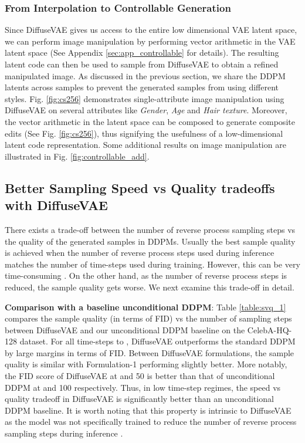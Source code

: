 \documentclass[10pt]{article} \usepackage[accepted]{tmlr}
\newcommand{\remove}[1]{}
\begin{document}
\subsubsection{From Interpolation to Controllable Generation}
Since DiffuseVAE gives us access to the entire low dimensional VAE latent space, we can perform image manipulation by performing vector arithmetic in the VAE latent space (See Appendix \ref{sec:app_controllable} for details). The resulting latent code can then be used to sample from DiffuseVAE to obtain a refined manipulated image. As discussed in the previous section, we share the DDPM latents across samples to prevent the generated samples from using different styles. Fig. \ref{fig:cs256} demonstrates single-attribute image manipulation using DiffuseVAE on several attributes like \textit{Gender}, \textit{Age} and \textit{Hair texture}. Moreover, the vector arithmetic in the latent space can be composed to generate composite edits (See Fig. \ref{fig:cs256}), thus signifying the usefulness of a low-dimensional latent code representation. Some additional results on image manipulation are illustrated in Fig. \ref{fig:controllable_add}.



\subsection{Better Sampling Speed vs Quality tradeoffs with DiffuseVAE}
\remove{The sample speed vs quality trade-off in DDPMs represents a trade-off between the number of reverse process sampling steps vs the quality of the generated samples.} There exists a trade-off between the number of reverse process sampling steps vs the quality of the generated samples in DDPMs. Usually the best sample quality is achieved when the number of reverse process steps used during inference matches the number of time-steps used during training. However, this can be very time-consuming \citep{song2021denoising}. On the other hand, as the number of reverse process steps is reduced, the sample quality gets worse. We next examine this trade-off in detail.

\textbf{Comparison with a baseline unconditional DDPM}: Table \ref{table:svq_1} compares the sample quality (in terms of FID) vs the number of sampling steps between DiffuseVAE and our unconditional DDPM baseline on the CelebA-HQ-128 dataset. For all time-steps  to , DiffuseVAE outperforms the standard DDPM by large margins in terms of FID. Between DiffuseVAE formulations, the sample quality is similar with Formulation-1 performing slightly better. More notably, the FID score of DiffuseVAE at  and 50 is better than that of unconditional DDPM at  and 100 respectively. Thus, in low time-step regimes, the speed vs quality tradeoff in DiffuseVAE is significantly better than an unconditional DDPM baseline. It is worth noting that this property is intrinsic to DiffuseVAE as the model was not specifically trained to reduce the number of reverse process sampling steps during inference \citep{salimans2022progressive}.
\end{document}
